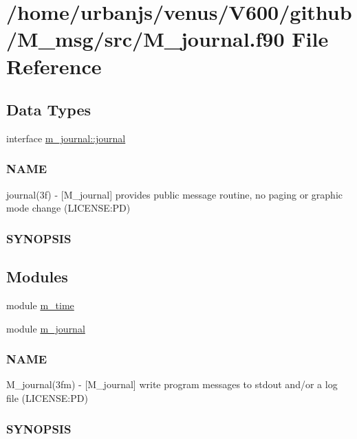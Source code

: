 \hypertarget{M__journal_8f90}{}\section{/home/urbanjs/venus/\+V600/github/\+M\+\_\+msg/src/\+M\+\_\+journal.f90 File Reference}
\label{M__journal_8f90}
\subsection*{Data Types}
\begin{DoxyCompactItemize}
\item 
interface \mbox{\hyperlink{interfacem__journal_1_1journal}{m\+\_\+journal\+::journal}}
\begin{DoxyCompactList}\small\item\em \subsubsection*{N\+A\+ME}

journal(3f) -\/ \mbox{[}M\+\_\+journal\mbox{]} provides public message routine, no paging or graphic mode change (L\+I\+C\+E\+N\+SE\+:PD) \subsubsection*{S\+Y\+N\+O\+P\+S\+IS}\end{DoxyCompactList}\end{DoxyCompactItemize}
\subsection*{Modules}
\begin{DoxyCompactItemize}
\item 
module \mbox{\hyperlink{namespacem__time}{m\+\_\+time}}
\item 
module \mbox{\hyperlink{namespacem__journal}{m\+\_\+journal}}
\begin{DoxyCompactList}\small\item\em \subsubsection*{N\+A\+ME}

M\+\_\+journal(3fm) -\/ \mbox{[}M\+\_\+journal\mbox{]} write program messages to stdout and/or a log file (L\+I\+C\+E\+N\+SE\+:PD) \subsubsection*{S\+Y\+N\+O\+P\+S\+IS}\end{DoxyCompactList}\end{DoxyCompactItemize}
